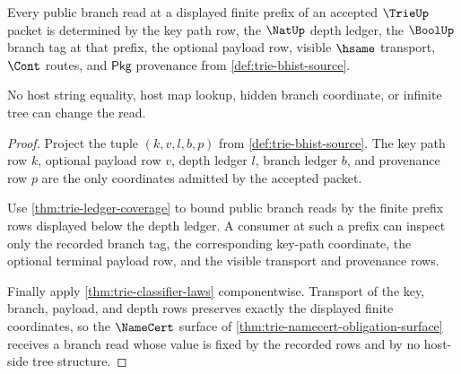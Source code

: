 \begin{theorem}
\label{thm:trie-obligation-prefix-branch-exactness}
Every public branch read at a displayed finite prefix of an accepted $\TrieUp$
packet is determined by the key path row, the $\NatUp$ depth ledger, the
$\BoolUp$ branch tag at that prefix, the optional payload row, visible
$\hsame$ transport, $\Cont$ routes, and $\mathsf{Pkg}$ provenance from
\autoref{def:trie-bhist-source}.

No host string equality, host map lookup, hidden branch coordinate, or infinite
tree can change the read.
\end{theorem}
\begin{proof}
Project the tuple $(k,v,l,b,p)$ from \autoref{def:trie-bhist-source}. The key
path row $k$, optional payload row $v$, depth ledger $l$, branch ledger $b$,
and provenance row $p$ are the only coordinates admitted by the accepted
packet.

Use \autoref{thm:trie-ledger-coverage} to bound public branch reads by the
finite prefix rows displayed below the depth ledger. A consumer at such a
prefix can inspect only the recorded branch tag, the corresponding key-path
coordinate, the optional terminal payload row, and the visible transport and
provenance rows.

Finally apply \autoref{thm:trie-classifier-laws} componentwise. Transport of
the key, branch, payload, and depth rows preserves exactly the displayed finite
coordinates, so the $\NameCert$ surface of
\autoref{thm:trie-namecert-obligation-surface} receives a branch read whose
value is fixed by the recorded rows and by no host-side tree structure.
\end{proof}

